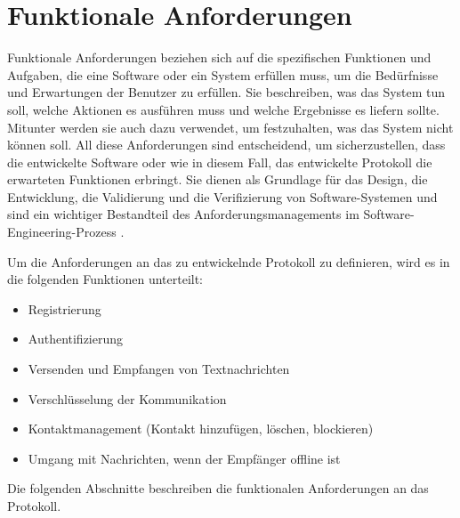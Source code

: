 \section{Funktionale Anforderungen}



Funktionale Anforderungen beziehen sich auf die spezifischen Funktionen und Aufgaben, die eine Software oder ein System erfüllen muss, um die Bedürfnisse und Erwartungen der Benutzer zu erfüllen. Sie beschreiben, was das System tun soll, welche Aktionen es ausführen muss und welche Ergebnisse es liefern sollte. Mitunter werden sie auch dazu verwendet, um festzuhalten, was das System nicht können soll. All diese Anforderungen sind entscheidend, um sicherzustellen, dass die entwickelte Software oder wie in diesem Fall, das entwickelte Protokoll die erwarteten Funktionen erbringt. Sie dienen als Grundlage für das Design, die Entwicklung, die Validierung und die Verifizierung von Software-Systemen und sind ein wichtiger Bestandteil des Anforderungsmanagements im Software-Engineering-Prozess \parencite[S. 124-126]{Sommerville_AnfAnalyse}.

Um die Anforderungen an das zu entwickelnde Protokoll zu definieren, wird es in die folgenden
Funktionen unterteilt:

\begin{itemize}
    \item Registrierung
    \item Authentifizierung
    \item Versenden und Empfangen von Textnachrichten
    \item Verschlüsselung der Kommunikation
    \item Kontaktmanagement (Kontakt hinzufügen, löschen, blockieren)
    \item Umgang mit Nachrichten, wenn der Empfänger offline ist
\end{itemize}

\noindent Die folgenden Abschnitte beschreiben die funktionalen Anforderungen an das Protokoll.







 

%
%